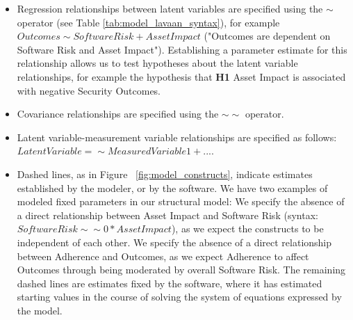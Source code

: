 \begin{itemize}
\item Regression relationships between latent variables are specified using the $\sim$  operator (see Table \ref{tab:model_lavaan_syntax}), for example $Outcomes \sim SoftwareRisk + AssetImpact$ ("Outcomes are dependent on Software Risk and Asset Impact"). Establishing a parameter estimate for this relationship allows us to test hypotheses about the latent variable relationships, for example the hypothesis that \textbf{H1} Asset Impact is associated with negative Security Outcomes.
 \item Covariance relationships are specified using the $\sim\sim$ operator.
\item Latent variable-measurement variable relationships are specified as follows: $LatentVariable =\sim MeasuredVariable1 + ...$. 
\item Dashed lines, as in Figure ~\ref{fig:model_constructs}, indicate estimates established by the modeler, or by the software. We have two examples of modeled fixed parameters in our structural model: We specify the absence of a direct relationship between Asset Impact and Software Risk (syntax: $SoftwareRisk \sim\sim 0*AssetImpact$), as we expect the constructs to be independent of each other. We specify the absence of a direct relationship between Adherence and Outcomes, as we expect Adherence to affect Outcomes through being moderated by overall Software Risk. The remaining dashed lines are estimates fixed by the software, where it has estimated starting values in the course of solving the system of equations expressed by the model.
\end{itemize}


